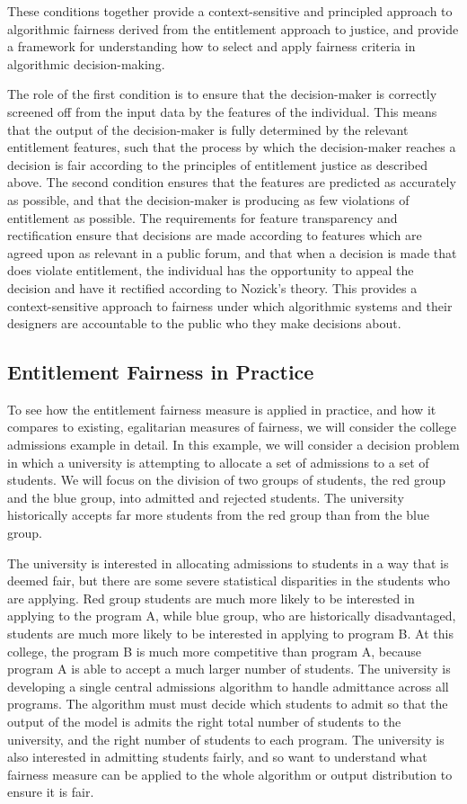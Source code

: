 These conditions together provide a context-sensitive and principled approach to
algorithmic fairness derived from the entitlement approach to justice, and 
provide a framework for understanding how to select and apply fairness criteria
in algorithmic decision-making.

The role of the first condition is to ensure that the decision-maker is
correctly screened off from the input data by the features of the individual.
This means that the output of the decision-maker is fully determined by the
relevant entitlement features, such that the process by which the decision-maker
reaches a decision is fair according to the principles of entitlement justice as
described above. The second condition ensures that the features are predicted
as accurately as possible, and that the decision-maker is producing as few 
violations of entitlement as possible. The requirements for feature
transparency and rectification ensure that decisions are made according to
features which are agreed upon as relevant in a public forum, and that when a
decision is made that does  violate entitlement, the individual has the
opportunity to appeal the decision and have it rectified according to Nozick's
theory. This provides a context-sensitive approach to fairness under which 
algorithmic systems and their designers are accountable to the public who they
make decisions about.

\subsection{Entitlement Fairness in Practice}

To see how the entitlement fairness measure is applied in practice, and how it 
compares to existing, egalitarian measures of fairness, we will consider the
college admissions example in detail. In this example, we will consider a
decision problem in which a university is attempting to allocate a set of
admissions to a set of students. We will focus on the division of two groups of
students, the red group and the blue group, into admitted and rejected students.
The university historically accepts far more students from the red group than
from the blue group.

The university is interested in allocating admissions to students in a way that
is deemed fair, but there are some severe statistical disparities in the
students who are applying. Red group students are much more likely to be
interested in applying to the program A, while blue group, who are historically
disadvantaged, students are much more likely to be interested in applying to
program B. At this college, the program B is much more competitive than program
A, because program A is able to accept a much larger number of students. The
university is developing a single central admissions algorithm to handle
admittance across all programs. The algorithm must must decide which students to
admit so that the output of the model is admits the right total number of
students to the university, and the right number of students to each program.
The university is also interested in admitting students fairly, and so want to
understand what fairness measure can be applied to the whole algorithm or output
distribution to ensure it is fair.


